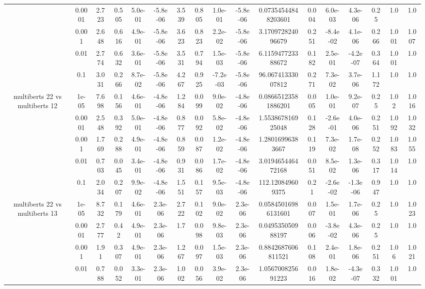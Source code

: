 \begin{tabular}{|c|c|c|c|c|c|c|c|c|c|c|c|c|c|c|c|c|}
 & 0.0001 & 2.723 & 0.505 & 5.0e-01 & -5.8e-06 & 3.539 & 0.805 & 1.0e-01 & -5.8e-06 & 0.07354544848203601 & 0.004 & 6.0e-03 & 4.3e-06 & 0.25 & 1.0 & 1.0 \\
 & 0.001 & 2.648 & 0.616 & 4.9e-01 & -5.8e-06 & 3.623 & 0.823 & 2.2e-02 & -5.8e-06 & 3.170972824096679 & 0.251 & -8.4e-02 & 4.1e-06 & 0.266 & 1.001 & 1.007 \\
 & 0.01 & 2.774 & 0.632 & 3.6e-01 & -5.8e-06 & 3.531 & 0.794 & 1.5e-03 & -5.8e-06 & 6.115947723388672 & 0.182 & 2.5e-01 & -4.2e-07 & 0.364 & 1.001 & 1.0 \\
 & 0.1 & 3.031 & 0.266 & 8.7e-02 & -5.8e-06 & 4.267 & 0.925 & -7.2e-03 & -5.8e-06 & 96.06741333007812 & 0.271 & 7.3e-02 & 3.7e-06 & 1.172 & 1.0 & 1.0 \\
\hline
\multirow{5}{*}{multiberts 22 vs multiberts 12} & 1e-05 & 7.698 & 0.156 & 4.6e-01 & -4.8e-06 & 1.284 & 0.099 & 9.0e-02 & -4.8e-06 & 0.08665123581886201 & 0.005 & 1.0e-01 & 9.2e-07 & 0.25 & 1.02 & 1.016 \\
 & 0.0001 & 2.548 & 0.392 & 5.0e-01 & -4.8e-06 & 0.877 & 0.092 & 5.8e-02 & -4.8e-06 & 1.553867816925048 & 0.128 & -2.6e-01 & 4.0e-06 & 0.251 & 1.092 & 1.032 \\
 & 0.001 & 1.769 & 0.288 & 4.9e-01 & -4.8e-06 & 0.859 & 0.087 & 1.2e-02 & -4.8e-06 & 1.28016996383667 & 0.119 & 7.3e-02 & 1.7e-08 & 0.252 & 1.083 & 1.055 \\
 & 0.01 & 0.703 & 0.045 & 3.4e-01 & -4.8e-06 & 0.931 & 0.086 & 1.7e-02 & -4.8e-06 & 3.019465446472168 & 0.051 & 8.5e-02 & 1.3e-06 & 0.317 & 1.014 & 1.0 \\
 & 0.1 & 2.034 & 0.207 & 9.9e-02 & -4.8e-06 & 1.551 & 0.157 & 9.5e-03 & -4.8e-06 & 112.120849609375 & 0.21 & -2.6e-02 & -1.3e-06 & 0.947 & 1.0 & 1.0 \\
\hline
\multirow{5}{*}{multiberts 22 vs multiberts 13} & 1e-05 & 8.732 & 0.179 & 4.6e-01 & 2.3e-06 & 2.722 & 0.102 & 9.0e-02 & 2.3e-06 & 0.05845016986131601 & 0.007 & 1.5e-01 & 1.7e-06 & 0.25 & 1.0 & 1.023 \\
 & 0.0001 & 2.777 & 0.42 & 4.9e-01 & 2.3e-06 & 1.7 & 0.098 & 9.8e-03 & 2.3e-06 & 0.049535050988197 & 0.006 & -3.8e-02 & 4.3e-06 & 0.25 & 1.0 & 1.0 \\
 & 0.001 & 1.91 & 0.307 & 4.9e-01 & 2.3e-06 & 1.267 & 0.097 & 1.5e-03 & 2.3e-06 & 0.8842687606811521 & 0.108 & 2.4e-01 & 1.8e-06 & 0.251 & 1.06 & 1.021 \\
 & 0.01 & 0.788 & 0.052 & 3.3e-01 & 2.3e-06 & 1.002 & 0.056 & 3.9e-02 & 2.3e-06 & 1.056700825691223 & 0.016 & 1.8e-02 & -4.3e-07 & 0.332 & 1.001 & 1.0 \\

\end{tabular}
